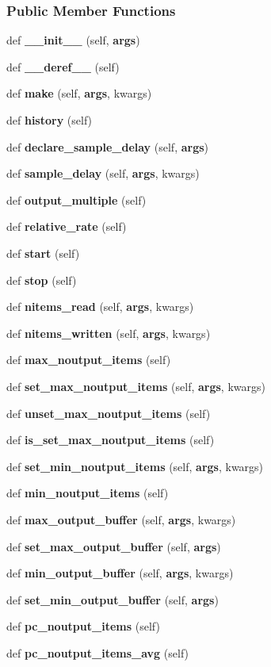 \subsubsection*{Public Member Functions}
\begin{DoxyCompactItemize}
\item 
def {\bf \+\_\+\+\_\+init\+\_\+\+\_\+} (self, {\bf args})
\item 
def {\bf \+\_\+\+\_\+deref\+\_\+\+\_\+} (self)
\item 
def {\bf make} (self, {\bf args}, kwargs)
\item 
def {\bf history} (self)
\item 
def {\bf declare\+\_\+sample\+\_\+delay} (self, {\bf args})
\item 
def {\bf sample\+\_\+delay} (self, {\bf args}, kwargs)
\item 
def {\bf output\+\_\+multiple} (self)
\item 
def {\bf relative\+\_\+rate} (self)
\item 
def {\bf start} (self)
\item 
def {\bf stop} (self)
\item 
def {\bf nitems\+\_\+read} (self, {\bf args}, kwargs)
\item 
def {\bf nitems\+\_\+written} (self, {\bf args}, kwargs)
\item 
def {\bf max\+\_\+noutput\+\_\+items} (self)
\item 
def {\bf set\+\_\+max\+\_\+noutput\+\_\+items} (self, {\bf args}, kwargs)
\item 
def {\bf unset\+\_\+max\+\_\+noutput\+\_\+items} (self)
\item 
def {\bf is\+\_\+set\+\_\+max\+\_\+noutput\+\_\+items} (self)
\item 
def {\bf set\+\_\+min\+\_\+noutput\+\_\+items} (self, {\bf args}, kwargs)
\item 
def {\bf min\+\_\+noutput\+\_\+items} (self)
\item 
def {\bf max\+\_\+output\+\_\+buffer} (self, {\bf args}, kwargs)
\item 
def {\bf set\+\_\+max\+\_\+output\+\_\+buffer} (self, {\bf args})
\item 
def {\bf min\+\_\+output\+\_\+buffer} (self, {\bf args}, kwargs)
\item 
def {\bf set\+\_\+min\+\_\+output\+\_\+buffer} (self, {\bf args})
\item 
def {\bf pc\+\_\+noutput\+\_\+items} (self)
\item 
def {\bf pc\+\_\+noutput\+\_\+items\+\_\+avg} (self)

\end{DoxyCompactItemize}
